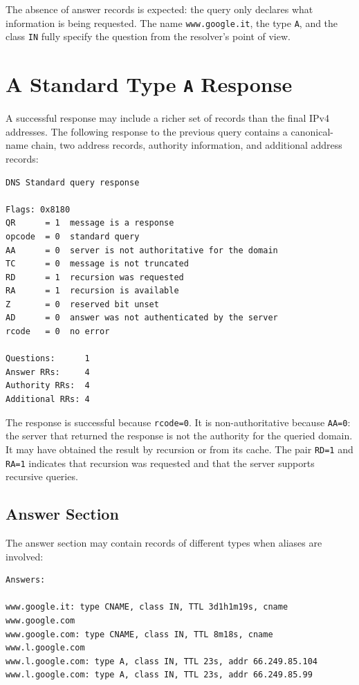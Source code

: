 \documentclass{scrbook}
\begin{document}
	The absence of answer records is expected: the query only declares what information is being requested. The name \texttt{www.google.it}, the type \texttt{A}, and the class \texttt{IN} fully specify the question from the resolver's point of view.
	
	\section{A Standard Type \texttt{A} Response}
	
	A successful response may include a richer set of records than the final IPv4 addresses. The following response to the previous query contains a canonical-name chain, two address records, authority information, and additional address records:
	\begin{lstlisting}
DNS Standard query response

Flags: 0x8180
QR      = 1  message is a response
opcode  = 0  standard query
AA      = 0  server is not authoritative for the domain
TC      = 0  message is not truncated
RD      = 1  recursion was requested
RA      = 1  recursion is available
Z       = 0  reserved bit unset
AD      = 0  answer was not authenticated by the server
rcode   = 0  no error

Questions:      1
Answer RRs:     4
Authority RRs:  4
Additional RRs: 4
	\end{lstlisting}
	
	The response is successful because \texttt{rcode=0}. It is non-authoritative because \texttt{AA=0}: the server that returned the response is not the authority for the queried domain. It may have obtained the result by recursion or from its cache. The pair \texttt{RD=1} and \texttt{RA=1} indicates that recursion was requested and that the server supports recursive queries.
	
	\subsection{Answer Section}
	
	The answer section may contain records of different types when aliases are involved:
	\begin{lstlisting}
Answers:

www.google.it: type CNAME, class IN, TTL 3d1h1m19s, cname www.google.com
www.google.com: type CNAME, class IN, TTL 8m18s, cname www.l.google.com
www.l.google.com: type A, class IN, TTL 23s, addr 66.249.85.104
www.l.google.com: type A, class IN, TTL 23s, addr 66.249.85.99
	\end{lstlisting}
	
\end{document}
